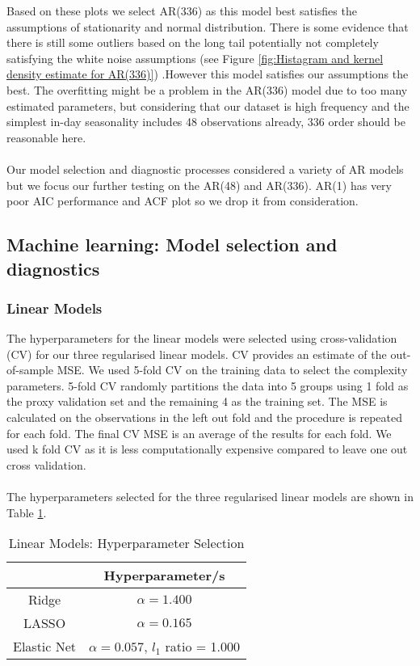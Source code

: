 \documentclass[11pt]{article}
\begin{document}
\noindent Based on these plots we select AR(336) as this model best satisfies the assumptions of stationarity and normal distribution. There is some evidence that there is still some outliers based on the long tail potentially not completely satisfying the white noise assumptions (see Figure \ref{fig:Histagram and kernel density estimate for AR(336)}) .However this model satisfies our assumptions the best. The overfitting might be a problem in the AR(336) model due to too many estimated parameters, but considering that our dataset is high frequency and the simplest in-day seasonality includes 48 observations already, 336 order should be reasonable here. 
\\
\\
Our model selection and diagnostic processes considered a variety of AR models but we focus our further testing on the AR(48) and AR(336). AR(1) has very poor AIC performance and ACF plot so we drop it from consideration.

\subsection{Machine learning: Model selection and diagnostics}

\subsubsection{Linear Models}

The hyperparameters for the linear models were selected using cross-validation (CV) for our three regularised linear models. CV provides an estimate of the out-of-sample MSE. We used 5-fold CV on the training data to select the complexity parameters. 5-fold CV randomly partitions the data into 5 groups using 1 fold as the proxy validation set and the remaining 4 as the training set. The MSE is calculated on the observations in the left out fold and the procedure is repeated for each fold. The final CV MSE is an average of the results for each fold. We used k fold CV as it is less computationally expensive compared to leave one out cross validation. 
\\
\\
The hyperparameters selected for the three regularised linear models are shown in Table \ref{table:hyperparameters_linear}.

\begin{table}[H]
\centering
\caption{Linear Models: Hyperparameter Selection}
\label{table:hyperparameters_linear}
\begin{tabular}{@{}cc@{}}
\toprule
 & \textbf{Hyperparameter/s} \\ \midrule
Ridge & $\alpha=1.400$ \\
LASSO & $\alpha=0.165$ \\
Elastic Net & $\alpha=0.057$, $l_1$ ratio = 1.000 \\ \bottomrule
\end{tabular}
\end{table}
\end{document}
